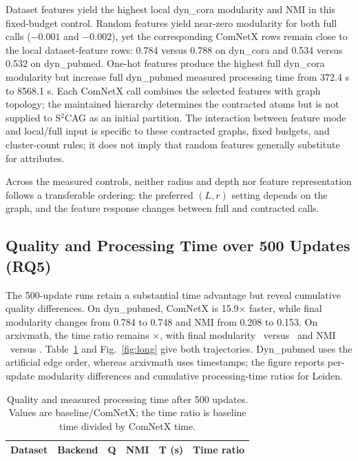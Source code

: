 \documentclass{ieeeaccess}
\begin{document}
Dataset features yield the highest local dyn\_cora modularity and NMI in this
fixed-budget control. Random features yield near-zero modularity for both full
calls ($-0.001$ and $-0.002$), yet the corresponding ComNetX rows remain close
to the local dataset-feature rows: 0.784 versus 0.788 on dyn\_cora and 0.534
versus 0.532 on dyn\_pubmed. One-hot features produce the highest full
dyn\_cora modularity but increase full dyn\_pubmed measured processing time
from 372.4 s to 8568.1 s. Each ComNetX call combines the selected features with
graph topology; the maintained hierarchy determines the contracted atoms but
is not supplied to S$^2$CAG as an initial partition. The interaction between
feature mode and local/full input is specific to these contracted graphs,
fixed budgets, and cluster-count rules; it does not imply that random features
generally substitute for attributes.

Across the measured controls, neither radius and depth nor feature
representation follows a transferable ordering: the preferred $(L,r)$ setting
depends on the graph, and the feature response changes between full and
contracted calls.

\subsection{Quality and Processing Time over 500 Updates (RQ5)}

The 500-update runs retain a substantial time advantage but reveal cumulative
quality differences. On dyn\_pubmed, ComNetX is 15.9$\times$ faster, while
final modularity changes from 0.784 to 0.748 and NMI from 0.208 to 0.153. On
arxivmath, the time ratio remains \ArxivLongSpeedup$\times$, with final
modularity \ArxivLongLocalQ\ versus \ArxivLongFullQ\ and NMI
\ArxivLongLocalNMI\ versus \ArxivLongFullNMI. Table~\ref{tab:long} and
Fig.~\ref{fig:long} give both trajectories. Dyn\_pubmed uses the artificial
edge order, whereas arxivmath uses timestamps; the figure reports per-update
modularity differences and cumulative processing-time ratios for Leiden.

\begin{table}[t]
\centering
\caption{Quality and measured processing time after 500 updates. Values are
baseline/ComNetX; the time ratio is baseline time divided by ComNetX time.}
\label{tab:long}
\setlength{\tabcolsep}{4.8pt}
\small
\begin{tabular}{@{}llcccc@{}}
\toprule
\textbf{Dataset} & \textbf{Backend} & \textbf{Q} & \textbf{NMI} &
\textbf{T (s)} & \textbf{Time ratio} \\
\midrule

\end{tabular}
\end{table}
\end{document}

